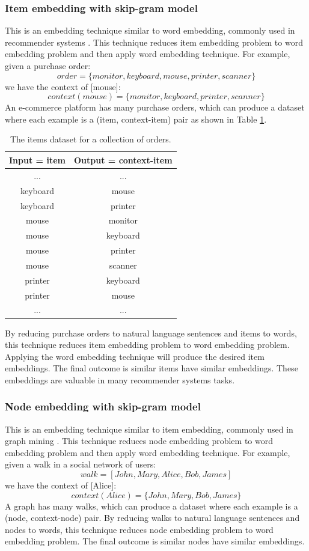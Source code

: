 \documentclass[conference]{IEEEtran}
\begin{document}
\subsubsection{Item embedding with skip-gram model}
This is an embedding technique similar to word embedding, commonly used in recommender systems \cite{barkan2016item2vec}.
This technique reduces item embedding problem to word embedding problem and then apply word embedding technique.
For example, given a purchase order:
\[ order = \{monitor, keyboard, mouse, printer, scanner\} \]
we have the context of [mouse]:
\[ context(mouse) = \{monitor, keyboard, printer, scanner\} \]
An e-commerce platform has many purchase orders, which can produce a dataset where each example is a (item, context-item) pair as shown in Table \ref{tab:items}.
\begin{table}[!ht]
	\centering
	\caption{The items dataset for a collection of orders.}
	\begin{tabular}{cc} \hline \rowcolor{blue!30}
		Input = item & Output = context-item \\ \hline
		... & ...       \\ \hline
		keyboard & mouse \\ \hline
		keyboard & printer \\ \hline
		mouse & monitor \\ \hline
		mouse & keyboard \\ \hline
		mouse & printer \\ \hline
		mouse & scanner \\ \hline
		printer & keyboard \\ \hline
		printer & mouse \\ \hline
		... & ...       \\ \hline
	\end{tabular}
	\label{tab:items}
\end{table}
By reducing purchase orders to natural language sentences and items to words,
this technique reduces item embedding problem to word embedding problem.
Applying the word embedding technique will produce the desired item embeddings.
The final outcome is similar items have similar embeddings.
These embeddings are valuable in many recommender systems tasks.

\subsubsection{Node embedding with skip-gram model}
This is an embedding technique similar to item embedding, commonly used in
graph mining \cite{perozzi2014deepwalk} \cite{grovernode2vec}.
This technique reduces node embedding problem to word embedding problem and then
apply word embedding technique.
For example, given a walk in a social network of users:
\[ walk = [John, Mary, Alice, Bob, James] \]
we have the context of [Alice]:
\[ context(Alice) = \{John, Mary, Bob, James\} \]
A graph has many walks, which can produce a dataset where each example is a (node, context-node) pair.
By reducing walks to natural language sentences and nodes to words,
this technique reduces node embedding problem to word embedding problem.
The final outcome is similar nodes have similar embeddings.
\end{document}
